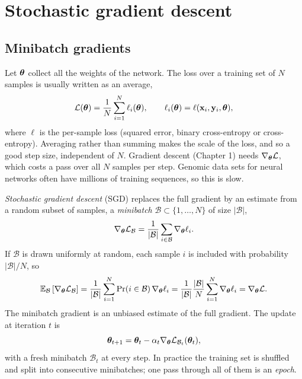 \section{Stochastic gradient descent}
\label{sec:sgd}

\subsection{Minibatch gradients}

Let $\boldsymbol{\theta}$ collect all the weights of the network. The loss over a training set of $N$ samples is usually written as an average,
\begin{equation}
  \mathcal{L}(\boldsymbol{\theta}) = \frac1N\sum_{i=1}^N\ell_i(\boldsymbol{\theta}), \qquad \ell_i(\boldsymbol{\theta})=\ell(\mathbf{x}_i,\mathbf{y}_i,\boldsymbol{\theta}),
\end{equation}
where $\ell$ is the per-sample loss (squared error, binary cross-entropy or cross-entropy). Averaging rather than summing makes the scale of the loss, and so a good step size, independent of $N$. Gradient descent (Chapter 1) needs $\nabla_{\boldsymbol{\theta}}\mathcal{L}$, which costs a pass over all $N$ samples per step. Genomic data sets for neural networks often have millions of training sequences, so this is slow.

\emph{Stochastic gradient descent} (SGD) replaces the full gradient by an estimate from a random subset of samples, a \emph{minibatch} $\mathcal{B}\subset\{1,\dots,N\}$ of size $|\mathcal{B}|$,
\begin{equation}
  \nabla_{\boldsymbol{\theta}}\mathcal{L}_{\mathcal{B}} = \frac{1}{|\mathcal{B}|}\sum_{i\in\mathcal{B}}\nabla_{\boldsymbol{\theta}}\ell_i .
\end{equation}
If $\mathcal{B}$ is drawn uniformly at random, each sample $i$ is included with probability $|\mathcal{B}|/N$, so
\begin{equation}
  \mathbb{E}_{\mathcal{B}}\left[\nabla_{\boldsymbol{\theta}}\mathcal{L}_{\mathcal{B}}\right] = \frac{1}{|\mathcal{B}|}\sum_{i=1}^N\Pr(i\in\mathcal{B})\,\nabla_{\boldsymbol{\theta}}\ell_i = \frac{1}{|\mathcal{B}|}\frac{|\mathcal{B}|}{N}\sum_{i=1}^N\nabla_{\boldsymbol{\theta}}\ell_i = \nabla_{\boldsymbol{\theta}}\mathcal{L} .
\end{equation}
The minibatch gradient is an unbiased estimate of the full gradient. The update at iteration $t$ is
\begin{equation}
  \boldsymbol{\theta}_{t+1} = \boldsymbol{\theta}_t - \alpha_t\nabla_{\boldsymbol{\theta}}\mathcal{L}_{\mathcal{B}_t}(\boldsymbol{\theta}_t),
\end{equation}
with a fresh minibatch $\mathcal{B}_t$ at every step. In practice the training set is shuffled and split into consecutive minibatches; one pass through all of them is an \emph{epoch}.

